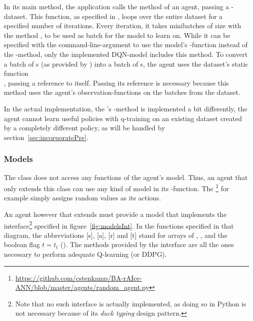 In its main method, the application  calls the method  of an agent, passing a -dataset. This function, as specified in , loops over the entire dataset for a specified number of iterations. Every iteration, it takes minibatches of size  with the method , to be used as batch for the model to learn on. While it can be specified with the command-line-argument  to use the model's -function instead of the -method, only the implemented DQN-model includes this method. To convert a batch of s (as provided by ) into a batch of s, the agent uses the dataset's static function\\ , passing a reference to itself. Passing its reference is necessary because this method uses the agent's observation-functions on the batches from the dataset.

In the actual implementation, the 's -method is implemented a bit differently, the agent cannot learn useful policies with q-training on an existing dataset created by a completely different policy, as will be handled by section~\ref{sec:incorporatePre}.



\subsubsection{Models}

The class  does not access any functions of the agent's model. Thus, an agent that only extends this class can use any kind of model in its -function. The \footnote{\url{https://github.com/cstenkamp/BA-rAIce-ANN/blob/master/agents/random\_agent.py}} for example simply assigns random values as its actions.

An agent however that extends  must provide a model that implements the interface\footnote{Note that no such interface is actually implemented, as doing so in Python is not necessary because of its \textit{duck typing} design pattern.} specified in figure~\ref{fig:modelsInt}. In the functions specified in that diagram, the abbreviations [s], [a], [r] and [t] stand for arrays of , ,  and the boolean flag $t = t_t$ (). The methods provided by the interface are all the ones necessary to perform adequate Q-learning (or DDPG).


